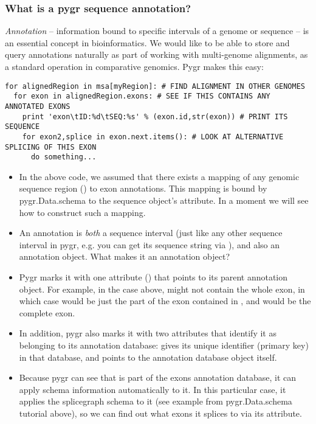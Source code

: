 \documentclass{howto}
\begin{document}
\subsubsection{What is a pygr sequence annotation?}
{\em Annotation} -- information bound to specific intervals of a genome
or sequence -- is an essential concept in bioinformatics.  We would like to
be able to store and query annotations naturally as part of working with
multi-genome alignments, as a standard operation in comparative genomics.
Pygr makes this easy:
\begin{verbatim}
for alignedRegion in msa[myRegion]: # FIND ALIGNMENT IN OTHER GENOMES
  for exon in alignedRegion.exons: # SEE IF THIS CONTAINS ANY ANNOTATED EXONS
    print 'exon\tID:%d\tSEQ:%s' % (exon.id,str(exon)) # PRINT ITS SEQUENCE
    for exon2,splice in exon.next.items(): # LOOK AT ALTERNATIVE SPLICING OF THIS EXON
      do something...
\end{verbatim}
\begin{itemize}
\item In the above code, we assumed that there exists a mapping of any genomic
sequence region () to exon annotations.  This mapping
is bound by pygr.Data.schema to the sequence object's  attribute.
In a moment we will see how to construct such a mapping.

\item An annotation is {\em both} a sequence interval (just like any other
sequence interval in pygr, e.g. you can get its sequence string via ),
and also an annotation object.  What makes it an annotation object?  

\item Pygr marks
it with one attribute () that points to its parent annotation
object.  For example, in the case above,  might not contain
the whole exon, in which case  would be just the part of the exon
contained in , and  would be the complete
exon.

\item In addition, pygr also marks it with 
two attributes that identify it as belonging to its annotation database:
 gives its unique identifier (primary key) in that database,
and  points to the annotation database object itself.

\item Because pygr can see that  is part of the exons annotation database,
it can apply schema information automatically to it.  In this particular case,
it applies the splicegraph schema to it (see example from pygr.Data.schema
tutorial above), so we can find out what exons it splices to via its 
attribute.
\end{itemize}
\end{document}
